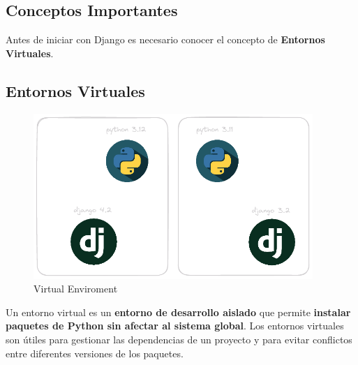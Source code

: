 \documentclass[
  a4paper,
  DIV=11,
  numbers=noendperiod,
  onepage,
  openany]{scrreprt}
\begin{document}
\begin{tcolorbox}
\section{Conceptos Importantes}\label{conceptos-importantes}

\begin{tcolorbox}[enhanced jigsaw, bottomrule=.15mm, title=\textcolor{quarto-callout-tip-color}{\faLightbulb}\hspace{0.5em}{Tip}, coltitle=black, leftrule=.75mm, left=2mm, colbacktitle=quarto-callout-tip-color!10!white, breakable, colframe=quarto-callout-tip-color-frame, colback=white, opacitybacktitle=0.6, opacityback=0, bottomtitle=1mm, toptitle=1mm, toprule=.15mm, arc=.35mm, titlerule=0mm, rightrule=.15mm]

Antes de iniciar con Django es necesario conocer el concepto de
\textbf{Entornos Virtuales}.

\end{tcolorbox}

\subsection{Entornos Virtuales}\label{entornos-virtuales}

\begin{figure}[H]

{\centering \includegraphics[width=4.16667in,height=\textheight]{images/python-venv.png}

}

\caption{Virtual Enviroment}

\end{figure}%

Un entorno virtual es un \textbf{entorno de desarrollo aislado }que
permite \textbf{instalar paquetes de Python sin afectar al sistema
global}. Los entornos virtuales son útiles para gestionar las
dependencias de un proyecto y para evitar conflictos entre diferentes
versiones de los paquetes.


\end{tcolorbox}
\end{document}
